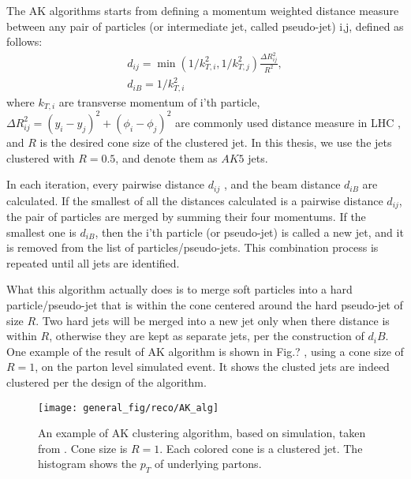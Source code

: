 The AK algorithms starts from defining a momentum weighted distance measure between any pair of particles (or intermediate jet, called pseudo-jet) i,j, defined as follows:
\begin{gather}
d_{ij} = \min(1/k_{T,i}^2,1/k_{T,j}^2)\frac{\Delta R^2_{ij}}{R^2},\\
d_{iB} = 1/k_{T,i}^2
\end{gather}
where $k_{T,i}$ are transverse momentum of i'th particle, $\Delta R_{ij}^2=(y_i-y_j)^2+(\phi_i-\phi_j)^2$ are commonly used distance measure in LHC , and $R$ is the desired cone size of the clustered jet. In this thesis, we use the jets clustered with $R=0.5$, and denote them as $AK5$ jets. 

In each iteration, every pairwise distance $d_{ij}$ , and the beam distance $d_{iB}$ are calculated. If the smallest of all the distances calculated is a pairwise distance $d_{ij}$, the pair of particles are merged by summing their four momentums. If the smallest one is $d_{iB}$, then the i'th particle (or pseudo-jet) is called a new jet, and it is removed from the list of particles/pseudo-jets. This combination process is repeated until all jets are identified.

What this algorithm actually does is to merge soft particles into a hard particle/pseudo-jet that is within the cone centered around the hard pseudo-jet of size $R$. Two hard jets will be merged into a new jet only when there distance is within $R$, otherwise they are kept as separate jets, per the construction of $d_iB$. One example of the result of AK algorithm is shown in Fig.? , using a cone size of $R=1$, on the parton level simulated event. It shows the clusted jets are indeed clustered per the design of the algorithm.

\begin{figure}
	\centering
	\texttt{[image: general\_fig/reco/AK\_alg]}
	\caption[An example of AK clustering algorithm]
	{\small An example of AK clustering algorithm, based on simulation, taken from \cite{jet_ak}. Cone size is $R=1$. Each colored cone is a clustered jet. The histogram shows the $p_T$ of underlying partons.}
	\label{fig:akalg}
\end{figure}



